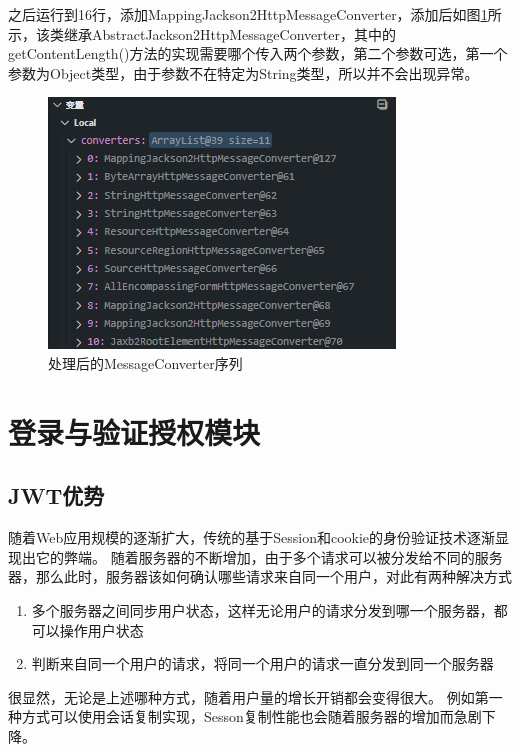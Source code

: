 之后运行到16行，添加MappingJackson2HttpMessageConverter，添加后如图\ref{MessageConverter-list-after-add}所示，该类继承AbstractJackson2HttpMessageConverter，其中的getContentLength()方法的实现需要哪个传入两个参数，第二个参数可选，第一个参数为Object类型，由于参数不在特定为String类型，所以并不会出现异常。

\begin{figure}[htbp]
  \centering
  \includegraphics[scale = 0.8]{out/figure/统一返回对象/WebMvcConfiguration-MessageConverter-debug-after-add.png}
  \caption{\song\wuhao 处理后的MessageConverter序列}
  \label{MessageConverter-list-after-add}
\end{figure}


\section{登录与验证授权模块}

\subsection{JWT优势}

随着Web应用规模的逐渐扩大，传统的基于Session和cookie的身份验证技术逐渐显现出它的弊端。
随着服务器的不断增加，由于多个请求可以被分发给不同的服务器，那么此时，服务器该如何确认哪些请求来自同一个用户，对此有两种解决方式
\begin{enumerate}
  \item 多个服务器之间同步用户状态，这样无论用户的请求分发到哪一个服务器，都可以操作用户状态
  \item 判断来自同一个用户的请求，将同一个用户的请求一直分发到同一个服务器
\end{enumerate}
很显然，无论是上述哪种方式，随着用户量的增长开销都会变得很大。
例如第一种方式可以使用会话复制实现，Sesson复制性能也会随着服务器的增加而急剧下降。\cite{.2019h}

